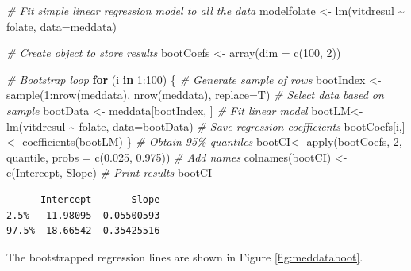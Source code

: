 \documentclass[
  oneside]{krantz}
\newenvironment{Shaded}{\begin{snugshade}}{\end{snugshade}}
\newcommand{\AttributeTok}[1]{\textcolor[rgb]{0.77,0.63,0.00}{#1}}
\newcommand{\CommentTok}[1]{\textcolor[rgb]{0.56,0.35,0.01}{\textit{#1}}}
\newcommand{\ControlFlowTok}[1]{\textcolor[rgb]{0.13,0.29,0.53}{\textbf{#1}}}
\newcommand{\DecValTok}[1]{\textcolor[rgb]{0.00,0.00,0.81}{#1}}
\newcommand{\FloatTok}[1]{\textcolor[rgb]{0.00,0.00,0.81}{#1}}
\newcommand{\FunctionTok}[1]{\textcolor[rgb]{0.00,0.00,0.00}{#1}}
\newcommand{\NormalTok}[1]{#1}
\newcommand{\OtherTok}[1]{\textcolor[rgb]{0.56,0.35,0.01}{#1}}
\newcommand{\SpecialCharTok}[1]{\textcolor[rgb]{0.00,0.00,0.00}{#1}}
\newcommand{\StringTok}[1]{\textcolor[rgb]{0.31,0.60,0.02}{#1}}
\begin{document}
\begin{Shaded}
\begin{Highlighting}[]
\CommentTok{\# Fit simple linear regression model to all the data}
\NormalTok{modelfolate }\OtherTok{\textless{}{-}} \FunctionTok{lm}\NormalTok{(vitdresul }\SpecialCharTok{\textasciitilde{}}\NormalTok{ folate, }\AttributeTok{data=}\NormalTok{meddata) }

\CommentTok{\# Create object to store results}
\NormalTok{bootCoefs }\OtherTok{\textless{}{-}} \FunctionTok{array}\NormalTok{(}\AttributeTok{dim =} \FunctionTok{c}\NormalTok{(}\DecValTok{100}\NormalTok{, }\DecValTok{2}\NormalTok{))}

\CommentTok{\# Bootstrap loop}
\ControlFlowTok{for}\NormalTok{ (i }\ControlFlowTok{in} \DecValTok{1}\SpecialCharTok{:}\DecValTok{100}\NormalTok{) \{}
  \CommentTok{\# Generate sample of rows}
\NormalTok{  bootIndex }\OtherTok{\textless{}{-}} \FunctionTok{sample}\NormalTok{(}\DecValTok{1}\SpecialCharTok{:}\FunctionTok{nrow}\NormalTok{(meddata), }\FunctionTok{nrow}\NormalTok{(meddata), }\AttributeTok{replace=}\NormalTok{T)}
  \CommentTok{\# Select data based on sample}
\NormalTok{  bootData }\OtherTok{\textless{}{-}}\NormalTok{ meddata[bootIndex, ] }
  \CommentTok{\# Fit linear model}
\NormalTok{  bootLM}\OtherTok{\textless{}{-}} \FunctionTok{lm}\NormalTok{(vitdresul }\SpecialCharTok{\textasciitilde{}}\NormalTok{ folate, }\AttributeTok{data=}\NormalTok{bootData)}
  \CommentTok{\# Save regression coefficients}
\NormalTok{  bootCoefs[i,] }\OtherTok{\textless{}{-}} \FunctionTok{coefficients}\NormalTok{(bootLM)}
\NormalTok{\}}
\CommentTok{\# Obtain 95\% quantiles}
\NormalTok{bootCI}\OtherTok{\textless{}{-}} \FunctionTok{apply}\NormalTok{(bootCoefs, }\DecValTok{2}\NormalTok{, quantile, }\AttributeTok{probs =} \FunctionTok{c}\NormalTok{(}\FloatTok{0.025}\NormalTok{, }\FloatTok{0.975}\NormalTok{))}
\CommentTok{\# Add names}
\FunctionTok{colnames}\NormalTok{(bootCI) }\OtherTok{\textless{}{-}} \FunctionTok{c}\NormalTok{(}\StringTok{\textquotesingle{}Intercept\textquotesingle{}}\NormalTok{, }\StringTok{\textquotesingle{}Slope\textquotesingle{}}\NormalTok{)}
\CommentTok{\# Print results}
\NormalTok{bootCI}
\end{Highlighting}
\end{Shaded}

\begin{verbatim}
      Intercept       Slope
2.5%   11.98095 -0.05500593
97.5%  18.66542  0.35425516
\end{verbatim}

The bootstrapped regression lines are shown in Figure \ref{fig:meddataboot}.
\end{document}
